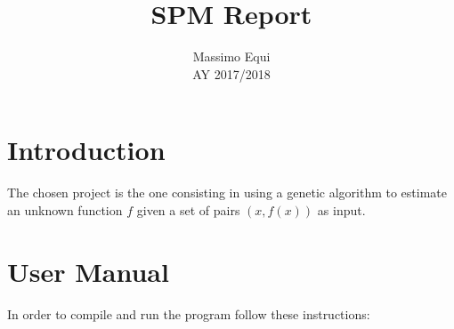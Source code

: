 \documentclass[10pt]{article}
\title{SPM Report}
\date{}
\author{
	Massimo Equi\\
	AY 2017/2018
}
\numberwithin{equation}{section}
\begin{document}
\maketitle

\section{Introduction}  \label{intro}
The chosen project is the one consisting in using a genetic algorithm to estimate an unknown function $f$ given a set of pairs $\left(x, f\left(x\right)\right)$ as input.

\section{User Manual} \label{usermanual}
In order to compile and run the program follow these instructions:
\end{document}
